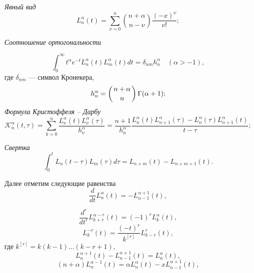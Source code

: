 \textit{Явный вид}
\begin{equation}\label{laplas-2.2}
L_n^\alpha(t) =
\sum\limits_{\nu=0}^{n}
\binom{n+\alpha}{n-\nu}
\frac{(-x)^\nu}{\nu!};
\end{equation}

\textit{Соотношение ортогональности}

\begin{equation}
\label{laplas-2.3}
\int_0^{\infty} t^{\alpha} e^{-t} L^{\alpha}_{n}(t) L^{\alpha}_{m}(t) dt = \delta_{nm} h^{\alpha}_n \quad (\alpha > -1),
\end{equation}
где $\delta_{nm}$ --- символ Кронекера,
\begin{equation}\label{laplas-2.4}
h^{\alpha}_n = \left( n+\alpha \atop n \right) \Gamma(\alpha +1);
\end{equation}
\textit{Формула Кристоффеля -- Дарбу}
\begin{equation}\label{laplas-2.5}
\mathcal{K}_n^\alpha(t,\tau)=
\sum\limits_{k=0}^{n}\frac{L_\nu^\alpha(t)L_\nu^\alpha(\tau)}{h_\nu^\alpha}=
\frac{n+1}{h_n^\alpha}
\frac{L_n^\alpha(t)L_{n+1}^\alpha(\tau) - L_n^\alpha(\tau)L_{n+1}^\alpha(t)}{t-\tau};
\end{equation}

\textit{Свертка}
\begin{equation}
\label{laplas-2.6}
\int_0^{t} L_{n}(t-\tau) L_{m}(\tau) d\tau = L_{n+m}(t) - L_{n+m+1}(t).
\end{equation}

Далее отметим следующие равенства
\begin{equation}\label{laplas-2.7}
\frac{d}{dt} L_n^{\alpha}(t) = -L_{n-1}^{\alpha+1}(t),
\end{equation}

\begin{equation} \label{laplas-2.8}
\frac{d^r}{dt^r} L_{k+r}^{\alpha-r}(t) = (-1)^{r} L_{k}^{\alpha}(t),
\end{equation}
\begin{equation}\label{laplas-2.9}
L_{k}^{-r}(t) = \frac{(-t)^{r}}{k^{[r]}} L_{k-r}^{r}(t),
\end{equation}
где $k^{[r]} = k(k-1)\ldots(k-r+1)$,
\begin{equation}\label{laplas-2.10}
L_n^{\alpha+1}(t)-L_{n-1}^{\alpha+1}(t)=L_n^\alpha(t),
     \end{equation}
 \begin{equation}\label{laplas-2.11}
(n+\alpha)L_n^{\alpha-1}(t)=\alpha L_n^\alpha(t)-
xL_{n-1}^{\alpha+1}(t),
\end{equation}

